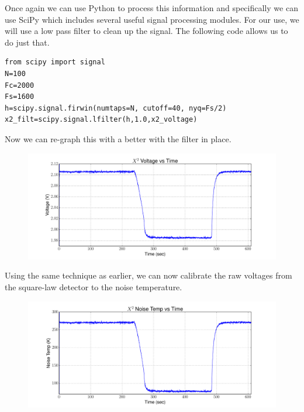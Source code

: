 Once again we can use Python to process this information and specifically we can use SciPy which includes several useful signal processing modules.  For our use, we will use a low pass filter to clean up the signal.  The following code allows us to do just that.

\begin{lstlisting}[frame=single,keywordstyle=\color{blue}]
from scipy import signal
N=100
Fc=2000
Fs=1600
h=scipy.signal.firwin(numtaps=N, cutoff=40, nyq=Fs/2)
x2_filt=scipy.signal.lfilter(h,1.0,x2_voltage)
\end{lstlisting}

Now we can re-graph this with a better with the filter in place.

\begin{figure}[h!tb] \centering

\includegraphics[width=\textwidth]{Experiments/Exp1/x2_filter.pdf}

\label{X2_filter}
\end{figure}

Using the same technique as earlier, we can now calibrate the raw voltages from the square-law detector to the noise temperature.

\begin{figure}[h!tb] \centering

\includegraphics[width=\textwidth]{Experiments/Exp1/x2_calibrated.pdf}

\label{X2_Calibrated}
\end{figure}

